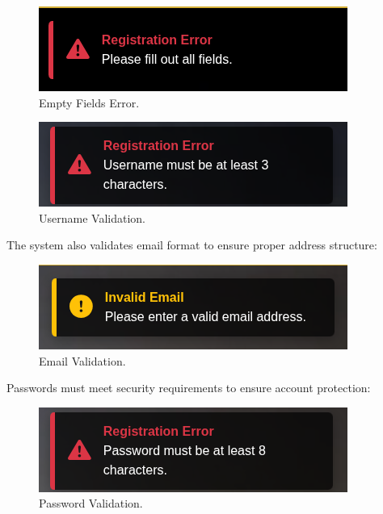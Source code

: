 \begin{figure}[H]
    \centering
    \includegraphics[width=0.6\linewidth]{Figures/images/new_images/ErrorFillOutAllTheFields.png}
    \caption{Empty Fields Error.} %
    \label{fig:error-empty-fields-wireframe}
\end{figure}

\begin{figure}[H]
    \centering
    \includegraphics[width=0.6\linewidth]{Figures/images/new_images/ErrorUserName.png}
    \caption{Username Validation.} %
    \label{fig:error-username-wireframe}
\end{figure}

The system also validates email format to ensure proper address structure:

\begin{figure}[H]
    \centering
    \includegraphics[width=0.6\linewidth]{Figures/images/new_images/ErrorEmail.png}
    \caption{Email Validation.} %
    \label{fig:error-email-wireframe}
\end{figure}

Passwords must meet security requirements to ensure account protection:

\begin{figure}[H]
    \centering
    \includegraphics[width=0.6\linewidth]{Figures/images/new_images/ErrorPassword.png}
    \caption{Password Validation.} %
    \label{fig:error-password-wireframe}
\end{figure}

